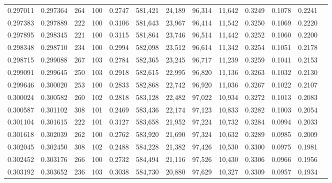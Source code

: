 \begin{tabular}{rrrrrrrrrrrrr}
0.297011 & 0.297364 &   264 & 100 &                                     0.2747 & 581,421 &  24,189 &  96,314 &  11,642 & 0.3249 & 0.1078 & 0.2241 \\
0.297383 & 0.297889 &   222 & 100 &                                     0.3106 & 581,643 &  23,967 &  96,414 &  11,542 & 0.3250 & 0.1069 & 0.2220 \\
0.297895 & 0.298345 &   221 & 100 &                                     0.3115 & 581,864 &  23,746 &  96,514 &  11,442 & 0.3252 & 0.1060 & 0.2200 \\
0.298348 & 0.298710 &   234 & 100 &                                     0.2994 & 582,098 &  23,512 &  96,614 &  11,342 & 0.3254 & 0.1051 & 0.2178 \\
0.298715 & 0.299088 &   267 & 103 &                                     0.2784 & 582,365 &  23,245 &  96,717 &  11,239 & 0.3259 & 0.1041 & 0.2153 \\
0.299091 & 0.299645 &   250 & 103 &                                     0.2918 & 582,615 &  22,995 &  96,820 &  11,136 & 0.3263 & 0.1032 & 0.2130 \\
0.299646 & 0.300020 &   253 & 100 &                                     0.2833 & 582,868 &  22,742 &  96,920 &  11,036 & 0.3267 & 0.1022 & 0.2107 \\
0.300024 & 0.300582 &   260 & 102 &                                     0.2818 & 583,128 &  22,482 &  97,022 &  10,934 & 0.3272 & 0.1013 & 0.2083 \\
0.300587 & 0.301102 &   308 & 101 &                                     0.2469 & 583,436 &  22,174 &  97,123 &  10,833 & 0.3282 & 0.1003 & 0.2054 \\
0.301104 & 0.301615 &   222 & 101 &                                     0.3127 & 583,658 &  21,952 &  97,224 &  10,732 & 0.3284 & 0.0994 & 0.2033 \\
0.301618 & 0.302039 &   262 & 100 &                                     0.2762 & 583,920 &  21,690 &  97,324 &  10,632 & 0.3289 & 0.0985 & 0.2009 \\
0.302045 & 0.302450 &   308 & 102 &                                     0.2488 & 584,228 &  21,382 &  97,426 &  10,530 & 0.3300 & 0.0975 & 0.1981 \\
0.302452 & 0.303176 &   266 & 100 &                                     0.2732 & 584,494 &  21,116 &  97,526 &  10,430 & 0.3306 & 0.0966 & 0.1956 \\
0.303192 & 0.303652 &   236 & 103 &                                     0.3038 & 584,730 &  20,880 &  97,629 &  10,327 & 0.3309 & 0.0957 & 0.1934 \\

\end{tabular}
